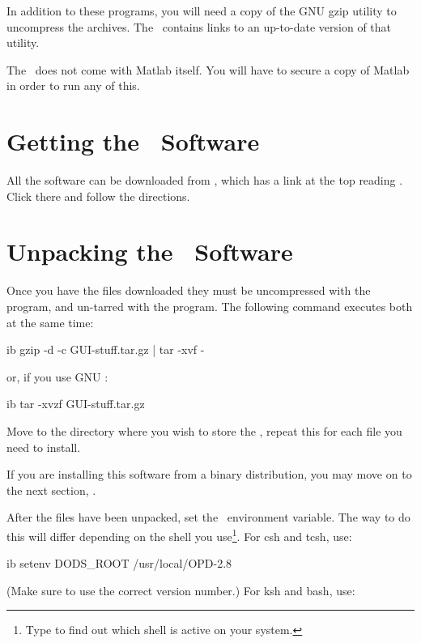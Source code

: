 In addition to these programs, you will need a copy of the GNU gzip
utility to uncompress the archives. The \OPDhome\ contains links to
an up-to-date version of that utility.

The \GUI\ does not come with Matlab itself. You will have to
secure a copy of Matlab in order to run any of this.

\section{Getting the \GUI\ Software}

All the \opendap software can be downloaded from \OPDhome, which has a
link at the top reading .  Click there and follow the
directions. 


\section{Unpacking the \GUI\ Software}
\label{install,unpack}

Once you have the files downloaded 
they must be uncompressed with the  program, and un-tarred
with the  program. The following command executes both at the
same time:

\begin{vcode}{ib}
gzip -d -c GUI-stuff.tar.gz | tar -xvf -
\end{vcode}

or, if you use GNU :

\begin{vcode}{ib}
tar -xvzf GUI-stuff.tar.gz 
\end{vcode}

Move to the directory where you wish to store the \GUI, 
repeat this for each  file you need to install.

If you are installing this software from a binary distribution, you
may move on to the next section, .

After the  files have been unpacked, set the \DODSroot\
environment variable. The way to do this will differ depending on the
shell you use\footnote{Type \lit{echo \$SHELL} to find out which shell is
active on your system.}. For csh and tcsh, use:

\begin{vcode}{ib}
setenv DODS_ROOT /usr/local/OPD-2.8
\end{vcode}

(Make sure to use the correct version number.)
For ksh and bash, use:

